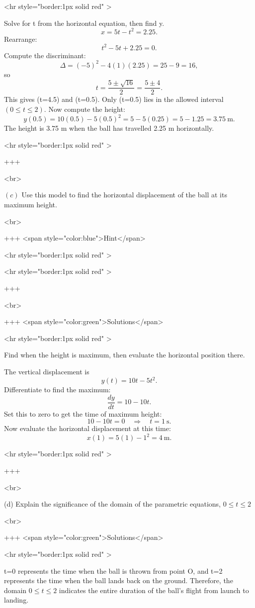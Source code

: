 <hr style="border:1px solid red" >

Solve for t from the horizontal equation, then find y.
$$
x=5t-t^{2}=2.25.
$$
Rearrange:
$$
t^{2}-5t+2.25=0.
$$
Compute the discriminant:
$$
\Delta=(-5)^{2}-4(1)(2.25)=25-9=16,
$$
so
$$
t=\frac{5\pm\sqrt{16}}{2}=\frac{5\pm4}{2}.
$$
This gives (t=4.5) and (t=0.5). Only (t=0.5) lies in the allowed interval $(0\le t\le2)$.
Now compute the height:
$$
y(0.5)=10(0.5)-5(0.5)^{2}=5-5(0.25)=5-1.25=3.75\ \text{m}.
$$
The height is 3.75 m when the ball has travelled 2.25 m horizontally.

<hr style="border:1px solid red" >

+++

<br>


\((c)\) Use this model to find the horizontal displacement of the ball at its maximum height.

<br>

+++ <span style="color:blue">Hint</span>

<hr style="border:1px solid red" >

<hr style="border:1px solid red" >

+++

<br>

+++ <span style="color:green">Solutions</span>

<hr style="border:1px solid red" >

Find when the height is maximum, then evaluate the horizontal position there.

The vertical displacement is
$$
y(t)=10t-5t^{2}.
$$
Differentiate to find the maximum:
$$
\frac{dy}{dt}=10-10t.
$$
Set this to zero to get the time of maximum height:
$$
10-10t=0 \quad\Rightarrow\quad t=1\ \text{s}.
$$
Now evaluate the horizontal displacement at this time:
$$
x(1)=5(1)-1^{2}=4\ \text{m}.
$$

<hr style="border:1px solid red" >

+++

<br>

(d) Explain the significance of the domain of the parametric equations, $0 \leq t \leq 2$

<br>

+++ <span style="color:green">Solutions</span>

<hr style="border:1px solid red" >

t=0 represents the time when the ball is thrown from point O, and t=2 represents the time when the ball lands back on the ground. Therefore, the domain $0 \leq t \leq 2$ indicates the entire duration of the ball's flight from launch to landing.

